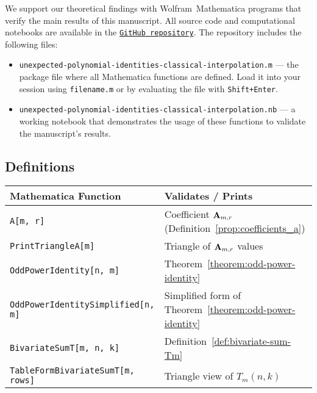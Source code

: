 We support our theoretical findings with Wolfram~Mathematica programs that verify the main results of this manuscript.
All source code and computational notebooks are available in the
\href{https://github.com/kolosovpetro/surprising-polynomial-identities-classical-interpolation}
{\texttt{GitHub repository}}.
The repository includes the following files:
\begin{itemize}
    \item \texttt{unexpected-polynomial-identities-classical-interpolation.m} --- the package file where
    all Mathematica functions are defined.
    Load it into your session using \texttt{filename.m} or by evaluating the file with \texttt{Shift+Enter}.
    \item \texttt{unexpected-polynomial-identities-classical-interpolation.nb} --- a working notebook that demonstrates
    the usage of these functions to validate the manuscript’s results.
\end{itemize}

\subsection*{Definitions}
\begin{center}
    \renewcommand{\arraystretch}{1.3}
    \begin{tabular}{ll}
        \toprule
        \textbf{Mathematica Function}             & \textbf{Validates / Prints}                                        \\
        \midrule
        \texttt{A[m, r]}                          & Coefficient ${\mathbf{A}} \sb{m,r}$ (Definition~\ref{prop:coefficients_a}) \\
        \texttt{PrintTriangleA[m]}                & Triangle of ${\mathbf{A}} \sb{m,r}$ values                                 \\
        \texttt{OddPowerIdentity[n, m]}           & Theorem~\ref{theorem:odd-power-identity}                           \\
        \texttt{OddPowerIdentitySimplified[n, m]} & Simplified form of Theorem~\ref{theorem:odd-power-identity}        \\
        \texttt{BivariateSumT[m, n, k]}           & Definition~\ref{def:bivariate-sum-Tm}                              \\
        \texttt{TableFormBivariateSumT[m, rows]}  & Triangle view of $T_m(n, k)$                                       \\
        \bottomrule
    \end{tabular}
\end{center}
\clearpage

